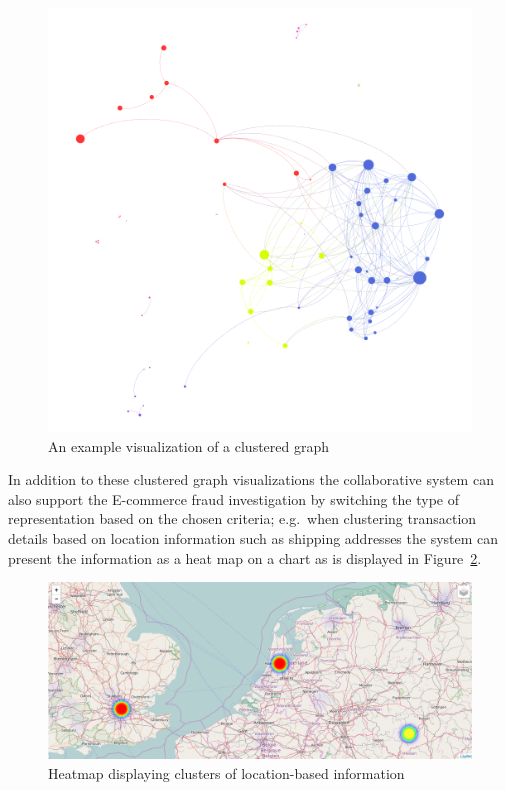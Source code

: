 \begin{figure}[H]
  \centering
  \includegraphics[width=0.8\columnwidth]{images/GraphViz.png}
  \caption[An example visualization of a clustered graph]{An example visualization of a clustered graph \citep{griffsgraphs}}
\label{fig:images_graph_viz}
\end{figure}

 In addition to these clustered graph visualizations the collaborative system can also support the \gls{E-commerce} fraud investigation by switching the type of representation based on the chosen criteria; e.g.\ when clustering transaction details based on location information such as shipping addresses the system can present the information as a heat map on a chart as is displayed in Figure~\ref{fig:images_map_heatmap}. \@

\begin{figure}[H]
  \centering
  \includegraphics[width=0.9\columnwidth]{images/Heatmap.png}
  \caption{Heatmap displaying clusters of location-based information}
\label{fig:images_map_heatmap}
\end{figure}

